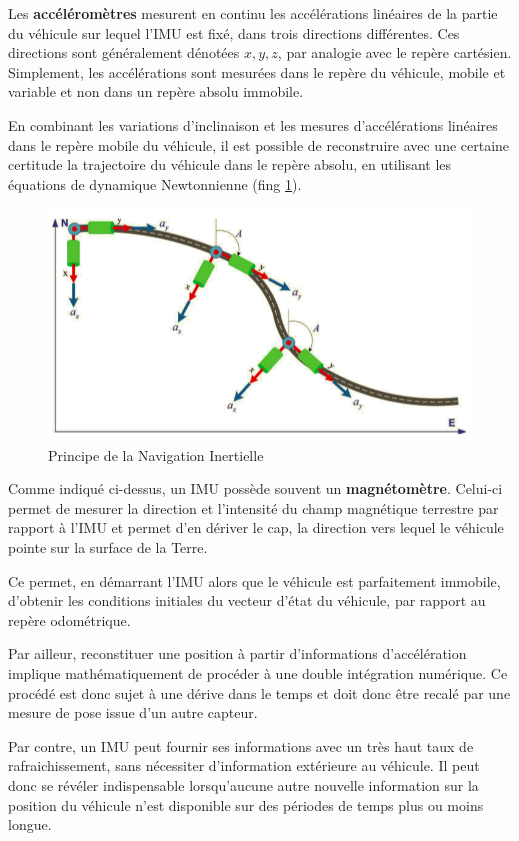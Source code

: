 \documentclass[12pt,a4paper]{report}
\begin{document}
		\para Les \textbf{accéléromètres} mesurent en continu les accélérations linéaires de la partie du véhicule sur lequel l'IMU est fixé, dans trois directions différentes. Ces directions sont généralement dénotées $x,y,z$, par analogie avec le repère cartésien. Simplement, les accélérations sont mesurées dans le repère du véhicule, mobile et variable et non dans un repère absolu immobile.
		
		\para En combinant les variations d'inclinaison et les mesures d'accélérations linéaires dans le repère mobile du véhicule, il est possible de reconstruire avec une certaine certitude la trajectoire du véhicule dans le repère absolu, en utilisant les équations de dynamique Newtonnienne (fing \ref{fig:navinertial}).
		
		\begin{figure}[h!]
			\centering
			\includegraphics[width=0.7\linewidth]{img/navinertial}
			\caption[Navigation Inertielle]{Principe de la Navigation Inertielle}
			\label{fig:navinertial}
		\end{figure}
		
		
		\para Comme indiqué ci-dessus, un IMU possède souvent un \textbf{magnétomètre}. Celui-ci permet de mesurer la direction et l'intensité du champ magnétique terrestre par rapport à l'IMU et permet d'en dériver le cap, la direction vers lequel le véhicule pointe sur la surface de la Terre. 
		
		\para Ce permet, en démarrant l'IMU alors que le véhicule est parfaitement immobile, d'obtenir les conditions initiales du vecteur d'état du véhicule, par rapport au repère odométrique.
		
		\para Par ailleur, reconstituer une position à partir d'informations d'accélération implique mathématiquement de procéder à une double intégration numérique. Ce procédé est donc sujet à une dérive dans le temps et doit donc être recalé par une mesure de pose issue d'un autre capteur.
		
		\para Par contre, un IMU peut fournir ses informations avec un très haut taux de rafraichissement, sans nécessiter d'information extérieure au véhicule. Il peut donc se révéler indispensable lorsqu'aucune autre nouvelle information sur la position du véhicule n'est disponible sur des périodes de temps plus ou moins longue.
		
\end{document}
